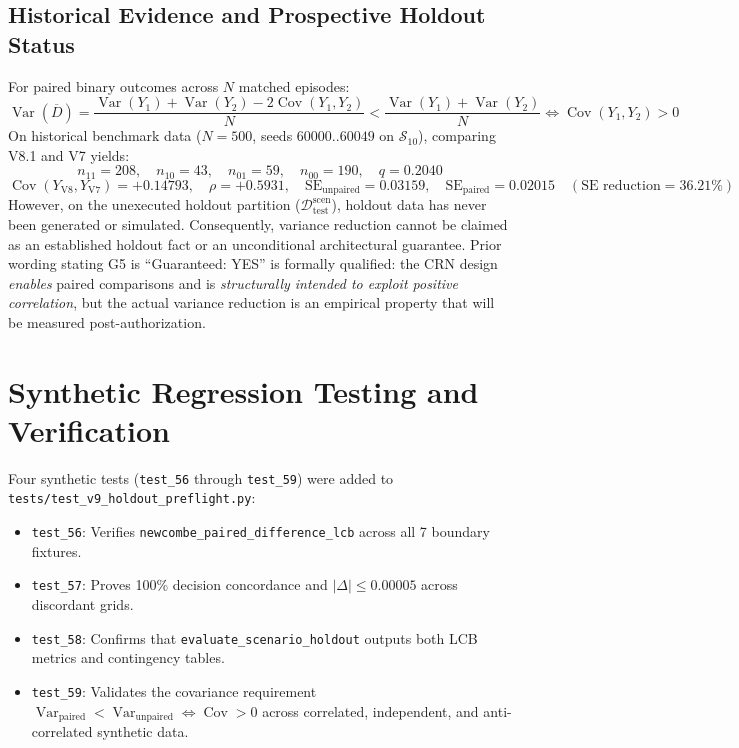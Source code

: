 \documentclass[10pt,a4paper]{article}
\begin{document}
\subsection{Historical Evidence and Prospective Holdout Status}
For paired binary outcomes across $N$ matched episodes:
\begin{equation}
\operatorname{Var}(\overline{D}) = \frac{\operatorname{Var}(Y_1) + \operatorname{Var}(Y_2) - 2\operatorname{Cov}(Y_1, Y_2)}{N} < \frac{\operatorname{Var}(Y_1) + \operatorname{Var}(Y_2)}{N} \iff \operatorname{Cov}(Y_1, Y_2) > 0
\end{equation}
On historical benchmark data ($N = 500$, seeds $60000..60049$ on $\mathcal{S}_{10}$), comparing V8.1 and V7 yields:
\begin{equation}
n_{11} = 208, \quad n_{10} = 43, \quad n_{01} = 59, \quad n_{00} = 190, \quad q = 0.2040
\end{equation}
\begin{equation}
\operatorname{Cov}(Y_{\mathrm{V8}}, Y_{\mathrm{V7}}) = +0.14793, \quad \rho = +0.5931, \quad \mathrm{SE}_{\text{unpaired}} = 0.03159, \quad \mathrm{SE}_{\text{paired}} = 0.02015 \quad (\text{SE reduction} = 36.21\%)
\end{equation}
However, on the unexecuted holdout partition ($\mathcal{D}_{\text{test}}^{\text{scen}}$), holdout data has never been generated or simulated. Consequently, variance reduction cannot be claimed as an established holdout fact or an unconditional architectural guarantee. Prior wording stating G5 is ``Guaranteed: YES'' is formally qualified: the CRN design \textit{enables} paired comparisons and is \textit{structurally intended to exploit positive correlation}, but the actual variance reduction is an empirical property that will be measured post-authorization.

\section{Synthetic Regression Testing and Verification}
Four synthetic tests (\texttt{test\_56} through \texttt{test\_59}) were added to \texttt{tests/test\_v9\_holdout\_preflight.py}:
\begin{itemize}
    \item \texttt{test\_56}: Verifies \texttt{newcombe\_paired\_difference\_lcb} across all 7 boundary fixtures.
    \item \texttt{test\_57}: Proves 100\% decision concordance and $|\Delta| \le 0.00005$ across discordant grids.
    \item \texttt{test\_58}: Confirms that \texttt{evaluate\_scenario\_holdout} outputs both LCB metrics and contingency tables.
    \item \texttt{test\_59}: Validates the covariance requirement $\operatorname{Var}_{\text{paired}} < \operatorname{Var}_{\text{unpaired}} \iff \operatorname{Cov} > 0$ across correlated, independent, and anti-correlated synthetic data.
\end{itemize}
\end{document}
